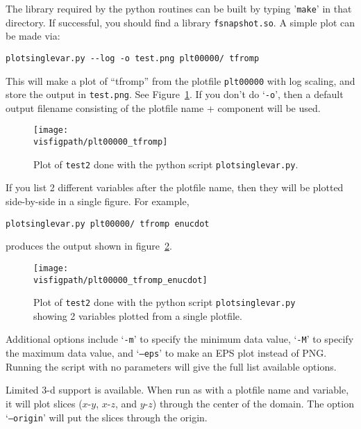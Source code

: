 The library required by the python routines can be built by typing
'{\tt make}' in that directory.  If successful, you should find
a library {\tt fsnapshot.so}.  A simple plot can be made via:
\begin{verbatim}
plotsinglevar.py --log -o test.png plt00000/ tfromp
\end{verbatim}
This will make a plot of ``tfromp'' from the plotfile {\tt plt00000} with log scaling,
and store the output in {\tt test.png}.  See Figure~\ref{fig:python}.
If you don't do `{\tt -o}', then a default output filename consisting of the
plotfile name + component will be used.

\begin{figure}[t]
\centering
\texttt{[image: \\visfigpath/plt00000\_tfromp]}
\caption[Basic plot of {\tt test2} done with {\tt plotsinglevar.py}]
{\label{fig:python} Plot of {\tt test2} done with the python
  script {\tt plotsinglevar.py}.}
\end{figure}

If you list 2 different variables after the plotfile name, then they
will be plotted side-by-side in a single figure.  For example, 
\begin{verbatim}
plotsinglevar.py plt00000/ tfromp enucdot
\end{verbatim}
produces the output shown in figure~\ref{fig:python_two}.

\begin{figure}[t]
\centering
\texttt{[image: \\visfigpath/plt00000\_tfromp\_enucdot]}
\caption[Plot of two variables from {\tt test2} done with {\tt plotsinglevar.py}]
{\label{fig:python_two} Plot of {\tt test2} done with the
  python script {\tt plotsinglevar.py} showing 2 variables plotted
  from a single plotfile.}
\end{figure}


Additional options include `{\tt -m}' to specify the minimum data
value, `{\tt -M}' to specify the maximum data value, and `{\tt --eps}'
to make an EPS plot instead of PNG.  Running the script with no parameters
will give the full list available options.


Limited 3-d support is available.  When run as with a plotfile name
and variable, it will plot slices ($x$-$y$, $x$-$z$, and $y$-$z$) 
through the center of the domain.  The option `{\tt --origin}'
will put the slices through the origin.


